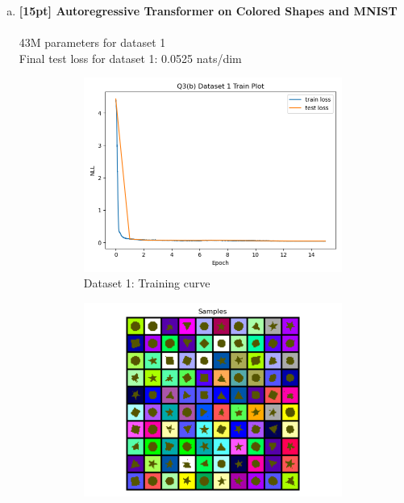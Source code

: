 \documentclass{article}
\begin{document}
\begin{enumerate}[(a)]
\item {\bf [15pt] Autoregressive Transformer on Colored Shapes and MNIST} \\\\
43M parameters for dataset 1 \\
Final test loss for dataset 1: 0.0525 nats/dim
\begin{figure}[H]
    \centering
    \begin{subfigure}{0.45\textwidth}
        \centering
        \includegraphics[width=\textwidth]{figures/q3_b_dset1_train_plot.png}
        \caption{Dataset 1: Training curve}
    \end{subfigure}
    \hspace{0.2in}
    \begin{subfigure}{0.45\textwidth}
        \centering
        \includegraphics[width=\textwidth]{figures/q3_b_dset1_samples.png}

\end{subfigure}
\end{figure}
\end{enumerate}
\end{document}
